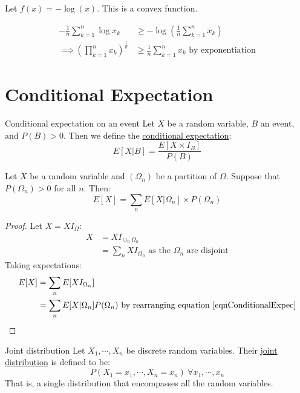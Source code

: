 \documentclass[../Main.tex]{subfiles}
\begin{document}
\begin{corollary}[AM-GM Inequality]
    Let $f(x) = -\log{(x)}$. This is a convex function.\par
    \begin{align*}
        -\frac{1}{n} \sum_{k=1}^n \log{x_k} & \geq -\log{(\frac{1}{n}\sum_{k=1}^n x_k)} \\
       \implies \left(\prod_{k=1}^n x_k\right)^{\frac{1}{n}} &\geq \frac{1}{n} \sum_{k=1}^n x_k \text{ by exponentiation}
    \end{align*}
    \label{corAMGM}
\end{corollary}
\section{Conditional Expectation}
\begin{definition}{Conditional expectation on an event}
    Let $X$ be a random variable, $B$ an event, and $P(B) > 0$. Then we define the \underline{conditional expectation}:
    \begin{equation}
        E[X | B] = \frac{E[X \times I_B]}{P(B)}
        \label{eqnConditionalExpec}
    \end{equation}
\end{definition}
\begin{lemma}
    Let $X$ be a random variable and $(\Omega_n)$ be a partition of $\Omega$. Suppose that $P(\Omega_n) > 0$ for all $n$. Then:
    \begin{equation*}
        E[X] = \sum_n E[X | \Omega_n] \times P(\Omega_n)
    \end{equation*}
\end{lemma}
\begin{proof}
    Let $X = XI_\Omega$:
    \begin{align*}
        X &= XI_{\cup_n \Omega_n} \\
        &= \sum_n XI_{\Omega_n} \text{ as the } \Omega_n \text{ are disjoint}
    \end{align*}
    Taking expectations:
    \begin{align*}
        E[X] &= \sum_n E[XI_{\Omega_n}] \\
        &= \sum_n E[X | \Omega_n] P(\Omega_n) \text{ by rearranging equation~\ref{eqnConditionalExpec}}
    \end{align*}
\end{proof}
\begin{definition}{Joint distribution}
    Let $X_1, \cdots, X_n$ be discrete random variables. Their \underline{joint distribution} is defined to be:
    \begin{equation*}
        P(X_1 = x_1, \cdots, X_n = x_n)~\forall x_1, \cdots, x_n
    \end{equation*}
    That is, a single distribution that encompasses all the random variables.
\end{definition}
\end{document}
